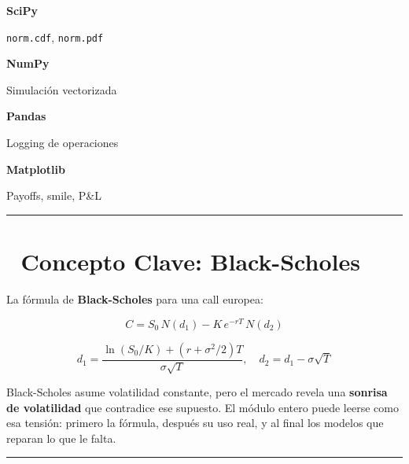 \documentclass[
  spanish,
  letterpaper,
  DIV=11,
  numbers=noendperiod]{scrreprt}
\begin{document}

\textbf{SciPy}

\texttt{norm.cdf}, \texttt{norm.pdf}

\textbf{NumPy}

Simulación vectorizada

\textbf{Pandas}

Logging de operaciones

\textbf{Matplotlib}

Payoffs, smile, P\&L

\begin{center}\rule{0.5\linewidth}{0.5pt}\end{center}

\section*{🔑 Concepto Clave:
Black-Scholes}\label{concepto-clave-black-scholes}


\begin{tcolorbox}[enhanced jigsaw, bottomrule=.15mm, colback=white, breakable, left=2mm, colframe=quarto-callout-important-color-frame, leftrule=.75mm, arc=.35mm, toprule=.15mm, rightrule=.15mm, opacityback=0]
\begin{minipage}[t]{5.5mm}
\textcolor{quarto-callout-important-color}{\faExclamation}
\end{minipage}%
\begin{minipage}[t]{\textwidth - 5.5mm}

La fórmula de \textbf{Black-Scholes} para una call europea:

\[C = S_0 \, N(d_1) - K \, e^{-rT} \, N(d_2)\]

\[d_1 = \frac{\ln(S_0/K) + (r + \sigma^2/2)T}{\sigma\sqrt{T}}, \quad d_2 = d_1 - \sigma\sqrt{T}\]

Black-Scholes asume volatilidad constante, pero el mercado revela una
\textbf{sonrisa de volatilidad} que contradice ese supuesto. El módulo
entero puede leerse como esa tensión: primero la fórmula, después su uso
real, y al final los modelos que reparan lo que le falta.

\end{minipage}%
\end{tcolorbox}

\begin{center}\rule{0.5\linewidth}{0.5pt}\end{center}
\end{document}
